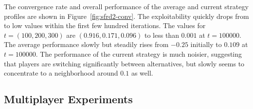 \documentclass{aamas2014}
\begin{document}
The convergence rate and overall performance of the average and current strategy profiles are shown in
Figure~\ref{fig:sfrd2-conv}. The exploitability quickly drops from to low values within the first few hundred iterations. 
The values for $t = (100,200,300)$ are $(0.916, 0.171, 0.096)$ to less than $0.001$ at $t = 100000$. 
The average performance slowly but steadily rises from $-0.25$ initially to $0.109$ at $t = 100000$. The performance of the 
current strategy is much noisier, 
suggesting that 
players are switching significantly between alternatives, 
but slowly seems to concentrate to a neighborhood around $0.1$ as well.

\subsection{Multiplayer Experiments}
\end{document}
